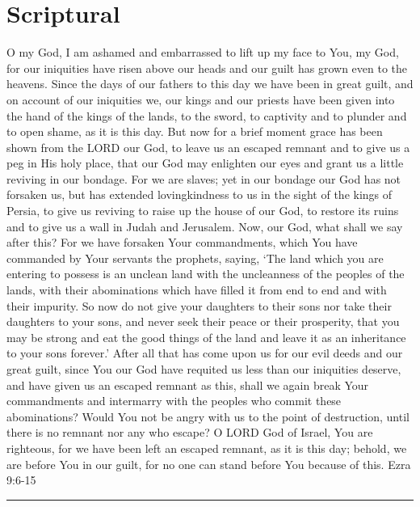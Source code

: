 \documentclass[]{book}
\begin{document}
\section{Scriptural}\label{scriptural}

O my God, I am ashamed and embarrassed to lift up my face to You, my
God, for our iniquities have risen above our heads and our guilt has
grown even to the heavens. Since the days of our fathers to this day we
have been in great guilt, and on account of our iniquities we, our kings
and our priests have been given into the hand of the kings of the lands,
to the sword, to captivity and to plunder and to open shame, as it is
this day. But now for a brief moment grace has been shown from the LORD
our God, to leave us an escaped remnant and to give us a peg in His holy
place, that our God may enlighten our eyes and grant us a little
reviving in our bondage. For we are slaves; yet in our bondage our God
has not forsaken us, but has extended lovingkindness to us in the sight
of the kings of Persia, to give us reviving to raise up the house of our
God, to restore its ruins and to give us a wall in Judah and Jerusalem.
Now, our God, what shall we say after this? For we have forsaken Your
commandments, which You have commanded by Your servants the prophets,
saying, `The land which you are entering to possess is an unclean land
with the uncleanness of the peoples of the lands, with their
abominations which have filled it from end to end and with their
impurity. So now do not give your daughters to their sons nor take their
daughters to your sons, and never seek their peace or their prosperity,
that you may be strong and eat the good things of the land and leave it
as an inheritance to your sons forever.' After all that has come upon us
for our evil deeds and our great guilt, since You our God have requited
us less than our iniquities deserve, and have given us an escaped
remnant as this, shall we again break Your commandments and intermarry
with the peoples who commit these abominations? Would You not be angry
with us to the point of destruction, until there is no remnant nor any
who escape? O LORD God of Israel, You are righteous, for we have been
left an escaped remnant, as it is this day; behold, we are before You in
our guilt, for no one can stand before You because of this. \textbar{}
Ezra 9:6-15

\begin{center}\rule{0.5\linewidth}{\linethickness}\end{center}
\end{document}
